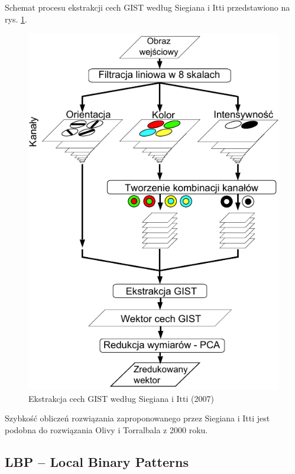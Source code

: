 Schemat procesu ekstrakcji cech GIST według Siegiana i Itti przedstawiono na rys. \ref{fig:gist-siagian}.

\begin{figure}[h]
	\centering
	\includegraphics[scale=1.0]{graphics/01_podstawy_teoretyczne/gist-siagian.pdf}
	\caption{ Ekstrakcja cech GIST według Siegiana i Itti (2007) \cite{SIAGIAN07} }
	\label{fig:gist-siagian}
\end{figure}

Szybkość obliczeń rozwiązania zaproponowanego przez Siegiana i Itti jest podobna do rozwiązania Olivy i Torralbala z 2000 roku.

\subsection{LBP -- Local Binary Patterns}

